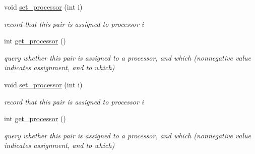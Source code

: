 \begin{Indent}
\begin{DoxyCompactItemize}
void \hyperlink{class_critical___pair___x_plor_a4c0085660583e247f354735ee900f2d3}{set\+\_\+processor} (int i)
\begin{DoxyCompactList}\small\item\em record that this pair is assigned to processor {\ttfamily i} \end{DoxyCompactList}\item 
\mbox{\label{class_critical___pair___x_plor_a1f07b8a991c138ad6c8de5deeb64ece6}} 
int \hyperlink{class_critical___pair___x_plor_a1f07b8a991c138ad6c8de5deeb64ece6}{get\+\_\+processor} ()
\begin{DoxyCompactList}\small\item\em query whether this pair is assigned to a processor, and which (nonnegative value indicates assignment, and to which) \end{DoxyCompactList}\item 
\mbox{\label{class_critical___pair___x_plor_a4c0085660583e247f354735ee900f2d3}} 
void \hyperlink{class_critical___pair___x_plor_a4c0085660583e247f354735ee900f2d3}{set\+\_\+processor} (int i)
\begin{DoxyCompactList}\small\item\em record that this pair is assigned to processor {\ttfamily i} \end{DoxyCompactList}\item 
\mbox{\label{class_critical___pair___x_plor_a1f07b8a991c138ad6c8de5deeb64ece6}} 
int \hyperlink{class_critical___pair___x_plor_a1f07b8a991c138ad6c8de5deeb64ece6}{get\+\_\+processor} ()
\begin{DoxyCompactList}\small\item\em query whether this pair is assigned to a processor, and which (nonnegative value indicates assignment, and to which) \end{DoxyCompactList}\end{DoxyCompactItemize}
\end{Indent}
